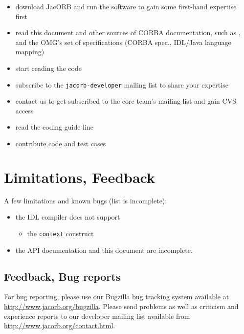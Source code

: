 \begin{itemize}
\item download JacORB and run the software to gain some first-hand
  expertise first
\item read this document and other sources of CORBA documentation,
  such as \cite{Brose2001a}, and the OMG's set of specifications
  (CORBA spec., IDL/Java language mapping)
\item start reading the code
\item subscribe to the {\tt jacorb-developer} mailing list to share
  your expertise
\item contact us to get subscribed to the core team's mailing list and
  gain CVS access
\item read the coding guide line
\item contribute code and test cases
\end{itemize}

\section{Limitations, Feedback}

A few limitations and known bugs (list is incomplete):

\begin{itemize}
    \item the IDL compiler does not support
    \begin{itemize}
        \item the {\tt context} construct
    \end{itemize}
    \item the API documentation and this document are incomplete.
\end{itemize}

\subsection{Feedback, Bug reports}

For bug reporting, please use our Bugzilla bug tracking system available at
\href{http://www.jacorb.org/bugzilla}{http://www.jacorb.org/bugzilla}.  Please
send problems as well as criticism and experience reports to our developer
mailing list available from
\href{http://www.jacorb.org/contact.html}{http://www.jacorb.org/contact.html}.


